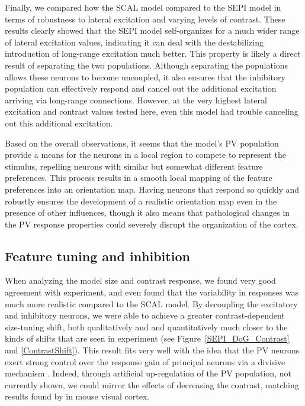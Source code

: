 Finally, we compared how the SCAL model compared to the SEPI model in
terms of robustness to lateral excitation and varying levels of
contrast. These results clearly showed that the SEPI model
self-organizes for a much wider range of lateral excitation values,
indicating it can deal with the destabilizing introduction of
long-range excitation much better. This property is likely a direct
result of separating the two populations. Although separating the
populations allows these neurons to become uncoupled, it also ensures
that the inhibitory population can effectively respond and cancel out
the additional excitation arriving via long-range
connections. However, at the very highest lateral excitation and
contrast values tested here, even this model had trouble canceling out
this additional excitation.

Based on the overall observations, it seems that the model's PV
population provide a means for the neurons in a local region to
compete to represent the stimulus, repelling neurons with similar but
somewhat different feature preferences.  This process results in a
smooth local mapping of the feature preferences into an orientation
map. Having neurons that respond so quickly and robustly ensures the
development of a realistic orientation map even in the presence of
other influences, though it also means that pathological changes in
the PV response properties could severely disrupt the organization of
the cortex.

\subsection{Feature tuning and inhibition}

When analyzing the model size and contrast response, we found very
good agreement with experiment, and even found that the variability in
responses was much more realistic compared to the SCAL model. By
decoupling the excitatory and inhibitory neurons, we were able to
achieve a greater contrast-dependent size-tuning shift, both
qualitatively and and quantitatively much closer to the kinds of
shifts that are seen in experiment (see Figure~\ref{SEPI_DoG_Contrast}
and \ref{ContrastShift}). This result fits very well with the idea
that the PV neurons exert strong control over the response gain of
principal neurons via a divisive mechanism \citep{Wilson2012}. Indeed,
through artificial up-regulation of the PV population, not currently
shown, we could mirror the effects of decreasing the contrast,
matching results found by \cite{Nienborg2013} in mouse visual cortex.

